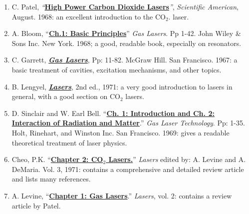 \documentclass{../lab}
\begin{document}
\begin{enumerate}
    \item C. Patel, \emph{``}\href{http://physics111.lib.berkeley.edu/Physics111/Reprints/CO2/01-High\_Power\_Carbon\_Dioxide\_Lasers.pdf}{\textbf{High Power Carbon Dioxide Lasers}}\emph{''}, \emph{Scientific American}, August. 1968: an excellent introduction to the CO$_2$. laser.

    \item A. Bloom, ``\href{http://physics111.lib.berkeley.edu/Physics111/Reprints/CO2/CO2\_ch1\_A\_Bloom\_Basic\%20Principles.pdf}{\textbf{Ch.1: Basic Principles}}'' \emph{Gas Lasers}. Pp 1-42. John Wiley \& Sons Inc. New York. 1968; a good, readable book, especially on resonators.

    \item C. Garrett, \emph{\href{http://physics111.lib.berkeley.edu/Physics111/Reprints/CO2/CO2\%20OCR\%20Gas\%20Lasers\%20Garrett\%20pg.\%2011-82.pdf}{\textbf{Gas Lasers}}}, Pp: 11-82. McGraw Hill. San Francisco. 1967: a basic treatment of cavities, excitation mechanisms, and other topics.

    \item B. Lengyel, \emph{\href{http://physics111.lib.berkeley.edu/Physics111/Reprints/CO2/02-Gas\_Lasers.pdf}{\textbf{Lasers}}}, 2nd ed., 1971: a very good introduction to lasers in general, with a good section on CO$_2$ lasers.

    \item D. Sinclair and W. Earl Bell. ``\href{http://physics111.lib.berkeley.edu/Physics111/Reprints/CO2/CO2\%20\%20OCR\%20ch1\%20and\%202\_Sinclair\_Bell.pdf}{\textbf{Ch. 1: Introduction and Ch. 2: Interaction of Radiation and Matter}}.'' \emph{Gas Laser Technology}. Pp: 1-35. Holt, Rinehart, and Winston Inc. San Francisco. 1969: gives a readable theoretical treatment of laser physics.

    \item Cheo, P.K. ``\href{http://physics111.lib.berkeley.edu/Physics111/Reprints/CO2/03-CO2\_Lasers.pdf}{\textbf{Chapter 2: CO$_2$ Lasers.}}'' \emph{Lasers} edited by: A. Levine and A. DeMaria. Vol. 3, 1971: contains a comprehensive and detailed review article and lists many references.

    \item A. Levine, ``\href{http://physics111.lib.berkeley.edu/Physics111/Reprints/Lasers\%20Vol\%202\%20Levine/Chapter\%201\%20Gas\%20lasers\%20CKN\%20Patel.pdf}{\textbf{Chapter 1: Gas Lasers}}.'' \emph{Lasers}, vol. 2: contains a review article by Patel.


\end{enumerate}
\end{document}
